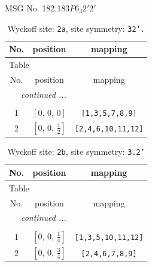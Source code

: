\documentclass[fleqn,8pt]{jsarticle}
\begin{document}
\setcounter{MaxMatrixCols}{32}

\renewcommand{\tablename}{Table~}
\renewcommand{\figurename}{Figure~}
\begin{center}
\LARGE
MSG No. 182.183\quad$P6_{3}2'2'$
\end{center}
\renewcommand{\arraystretch}{1.2}
\begin{longtable}{ccc}
\caption{Wyckoff site: {\tt 2a}, site symmetry: {\tt 32'.}}
 \\
 \hline \hline
No. & position & mapping \\ \hline \endfirsthead

\multicolumn{2}{l}{\tablename\ \thetable{}} \\
 \hline \hline
No. & position & mapping \\ \hline \endhead

 \hline \hline
\multicolumn{2}{r}{\footnotesize\it continued ...} \\ \endfoot

 \hline \hline
\multicolumn{2}{r}{} \\ \endlastfoot

1 & $\left[ 0,\, 0,\, 0 \right]$ & {\tt [1,3,5,7,8,9]} \\ \hline
2 & $\left[ 0,\, 0,\, \frac{1}{2} \right]$ & {\tt [2,4,6,10,11,12]} \\
\end{longtable}
\renewcommand{\arraystretch}{1.2}
\begin{longtable}{ccc}
\caption{Wyckoff site: {\tt 2b}, site symmetry: {\tt 3.2'}}
 \\
 \hline \hline
No. & position & mapping \\ \hline \endfirsthead

\multicolumn{2}{l}{\tablename\ \thetable{}} \\
 \hline \hline
No. & position & mapping \\ \hline \endhead

 \hline \hline
\multicolumn{2}{r}{\footnotesize\it continued ...} \\ \endfoot

 \hline \hline
\multicolumn{2}{r}{} \\ \endlastfoot

1 & $\left[ 0,\, 0,\, \frac{1}{4} \right]$ & {\tt [1,3,5,10,11,12]} \\ \hline
2 & $\left[ 0,\, 0,\, \frac{3}{4} \right]$ & {\tt [2,4,6,7,8,9]} \\
\end{longtable}
\end{document}
